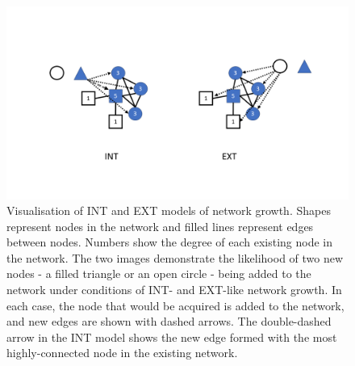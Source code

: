 \documentclass[
  man]{apa6}
\begin{document}
\begin{figure}
\centering
\includegraphics{Images/INT-EXT.png}
\caption{\label{fig:INT-EXT-vis}Visualisation of INT and EXT models of network growth. Shapes represent nodes in the network and filled lines represent edges between nodes. Numbers show the degree of each existing node in the network. The two images demonstrate the likelihood of two new nodes - a filled triangle or an open circle - being added to the network under conditions of INT- and EXT-like network growth. In each case, the node that would be acquired is added to the network, and new edges are shown with dashed arrows. The double-dashed arrow in the INT model shows the new edge formed with the most highly-connected node in the existing network.}
\end{figure}
\end{document}
